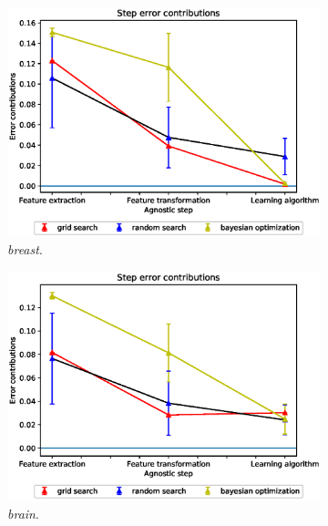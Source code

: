 \begin{figure}[ht!]
\centering
\begin{subfigure}{.5\textwidth}
  \centering
  \includegraphics[scale=0.37]{img/EP/agnostic_error_steps_breast.eps}
  \caption{\textit{breast}.}
  \label{fig:eq_steps_breast}
\end{subfigure}%
\begin{subfigure}{.5\textwidth}
  \centering
  \includegraphics[scale=0.37]{img/EP/agnostic_error_steps_brain.eps}
  \caption{\textit{brain}.}
  \label{fig:eq_step_brain}
\end{subfigure}
\begin{subfigure}{.5\textwidth}
  \centering

\end{subfigure}
\end{figure}
